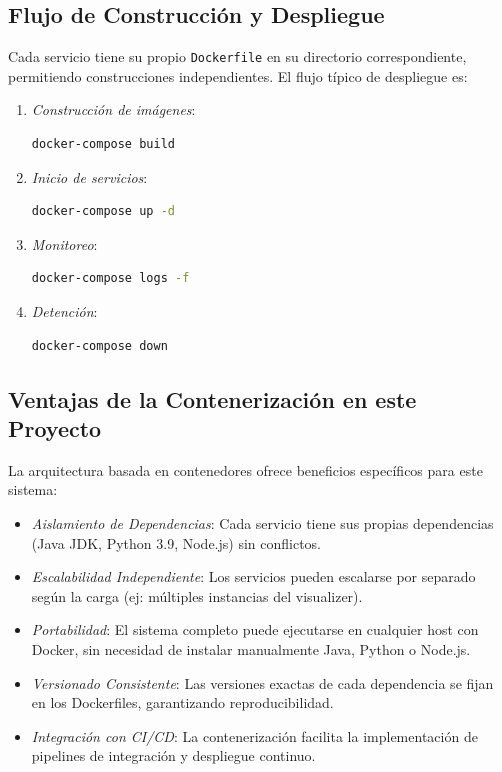 \documentclass{article}
\begin{document}
\subsection{Flujo de Construcción y Despliegue}
Cada servicio tiene su propio \texttt{Dockerfile} en su directorio correspondiente, permitiendo construcciones independientes. El flujo típico de despliegue es:

\begin{enumerate}
    \item \textit{Construcción de imágenes}:
    \begin{lstlisting}[language=bash, basicstyle=\small\ttfamily]
    docker-compose build
    \end{lstlisting}

    \item \textit{Inicio de servicios}:
    \begin{lstlisting}[language=bash, basicstyle=\small\ttfamily]
    docker-compose up -d
    \end{lstlisting}

    \item \textit{Monitoreo}:
    \begin{lstlisting}[language=bash, basicstyle=\small\ttfamily]
    docker-compose logs -f
    \end{lstlisting}

    \item \textit{Detención}:
    \begin{lstlisting}[language=bash, basicstyle=\small\ttfamily]
    docker-compose down
    \end{lstlisting}
\end{enumerate}

\subsection{Ventajas de la Contenerización en este Proyecto}
La arquitectura basada en contenedores ofrece beneficios específicos para este sistema:

\begin{itemize}
    \item \textit{Aislamiento de Dependencias}: Cada servicio tiene sus propias dependencias (Java JDK, Python 3.9, Node.js) sin conflictos.

    \item \textit{Escalabilidad Independiente}: Los servicios pueden escalarse por separado según la carga (ej: múltiples instancias del visualizer).

    \item \textit{Portabilidad}: El sistema completo puede ejecutarse en cualquier host con Docker, sin necesidad de instalar manualmente Java, Python o Node.js.

    \item \textit{Versionado Consistente}: Las versiones exactas de cada dependencia se fijan en los Dockerfiles, garantizando reproducibilidad.

    \item \textit{Integración con CI/CD}: La contenerización facilita la implementación de pipelines de integración y despliegue continuo.
\end{itemize}
\end{document}
